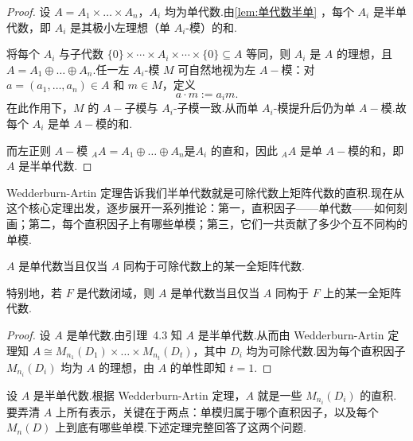 \begin{proof}
 设 $A = A_1 \times \dots \times A_n$，$A_i$ 均为单代数.由\cref{lem:单代数半单} ，每个 $A_i$ 是半单代数，即 $A_i$ 是其极小左理想（单 $A_i$-模）的和.

将每个 $A_i$ 与子代数 $\{0\}\times\cdots\times A_i\times\cdots\times\{0\} \subseteq A$ 等同，则 $A_i$ 是 $A$ 的理想，且 $A = A_1 \oplus \dots \oplus A_n$.任一左 $A_i$-模 $M$ 可自然地视为左 $A-\!\!$模：对 $a = (a_1,\dots,a_n) \in A$ 和 $m \in M$，定义
\[
a \cdot m := a_i m.
\]
在此作用下，$M$ 的 $A-\!\!$子模与 $A_i$-子模一致.从而单 $A_i$-模提升后仍为单 $A-\!\!$模.故每个 $A_i$ 是单 $A-\!\!$模的和.

而左正则 $A-\!\!$模 ${}_A A = A_1 \oplus \dots \oplus A_n$是$A_i$ 的直和，因此 ${}_A A$ 是单 $A-\!\!$模的和，即 $A$ 是半单代数.
\end{proof}


Wedderburn-Artin 定理告诉我们半单代数就是可除代数上矩阵代数的直积.现在从这个核心定理出发，逐步展开一系列推论：第一，直积因子——单代数——如何刻画；第二，每个直积因子上有哪些单模；第三，它们一共贡献了多少个互不同构的单模.

\begin{corollary}
$A$ 是单代数当且仅当 $A$ 同构于可除代数上的某一全矩阵代数.

特别地，若 $F$ 是代数闭域，则 $A$ 是单代数当且仅当 $A$ 同构于 $F$ 上的某一全矩阵代数.
\end{corollary}

\begin{proof}
设 $A$ 是单代数.由引理~4.3 知 $A$ 是半单代数.从而由 Wedderburn-Artin 定理知 $A \cong M_{n_1}(D_1) \times \dots \times M_{n_t}(D_t)$，其中 $D_i$ 均为可除代数.因为每个直积因子 $M_{n_i}(D_i)$ 均为 $A$ 的理想，由 $A$ 的单性即知 $t=1$.
\end{proof}


设 $A$ 是半单代数.根据 Wedderburn-Artin 定理，$A$ 就是一些 $M_{n_i}(D_i)$ 的直积.要弄清 $A$ 上所有表示，关键在于两点：单模归属于哪个直积因子，以及每个 $M_n(D)$ 上到底有哪些单模.下述定理完整回答了这两个问题.

